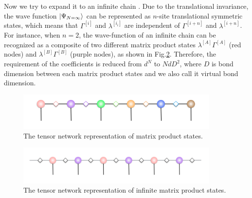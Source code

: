 Now we try to expand it to an infinite chain \cite{PhysRevLett.98.070201}. Due to the translational invariance, the wave function $\Ket{\Psi_{N=\infty}}$ can be represented as $n$-site translational symmetric states, which means that $\Gamma^{[i]}$ and $\lambda^{[i_{i}]}$ are independent of $\Gamma^{[i+n]}$ and $\lambda^{[i+n]}$. For instance, when $n=2$, the wave-function of an infinite chain can be recognized as a composite of two different matrix product states $\lambda^{[A]}\Gamma^{[A]}$ (red nodes) and $\lambda^{[B]}\Gamma^{[B]}$ (purple nodes), as shown in Fig.\ref{fig312}. Therefore, the requirement of the coefficients is reduced from $d^N$ to $NdD^2$, where $D$ is bond dimension between each matrix product states and we also call it virtual bond dimension.

\begin{figure}[hb]
	\centering
	\includegraphics[width=0.90\textwidth]{figures/fig3111.png}
	\caption[The tensor network representation of matrix product states]{The tensor network representation of matrix product states.}
	\label{fig311}
\end{figure}

\begin{figure}[hb]
	\centering
	\includegraphics[width=0.90\textwidth]{figures/fig311.png}
	\caption[The tensor network representation of infinite matrix product states]{The tensor network representation of infinite matrix product states.}
	\label{fig312}
\end{figure}
